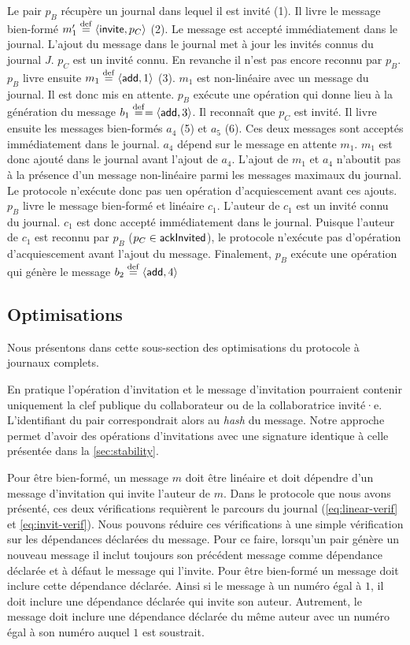 Le pair $p_B$ récupère un journal dans lequel il est invité (1).
Il livre le message bien-formé $m_1' \defeq \tuple*{\trm{invite}, p_C}$ (2).
Le message est accepté immédiatement dans le journal.
L'ajout du message dans le journal met à jour les invités connus du journal $J$.
$p_C$ est un invité connu.
En revanche il n'est pas encore reconnu par $p_B$.
$p_B$ livre ensuite $m_1 \defeq \tuple*{\trm{add}, 1}$ (3).
$m_1$ est non-linéaire avec un message du journal.
Il est donc mis en attente.
$p_B$ exécute une opération qui donne lieu à la génération du message $b_1 \defeq = \tuple*{\trm{add}, 3}$.
Il reconnaît que $p_C$ est invité.
Il livre ensuite les messages bien-formés $a_4$ (5) et $a_5$ (6).
Ces deux messages sont acceptés immédiatement dans le journal.
$a_4$ dépend sur le message en attente $m_1$.
$m_1$ est donc ajouté dans le journal avant l'ajout de $a_4$.
L'ajout de $m_1$ et $a_4$ n'aboutit pas à la présence d'un message non-linéaire parmi les messages maximaux du journal.
Le protocole n'exécute donc pas uen opération d'acquiescement avant ces ajouts.
$p_B$ livre le message bien-formé et linéaire $c_1$.
L'auteur de $c_1$ est un invité connu du journal.
$c_1$ est donc accepté immédiatement dans le journal.
Puisque l'auteur de $c_1$ est reconnu par $p_B$ ($p_C \in \trm{ackInvited}$), le protocole n'exécute pas d'opération d'acquiescement avant l'ajout du message.
Finalement, $p_B$ exécute une opération qui génère le message $b_2 \defeq \tuple*{\trm{add},4}$


\subsection{Optimisations}\label{subsec:full-log-opti}

Nous présentons dans cette sous-section des optimisations du protocole à journaux complets.

En pratique l'opération d'invitation et le message d'invitation pourraient contenir uniquement la clef publique du collaborateur ou de la collaboratrice invité·e.
L'identifiant du pair correspondrait alors au \emph{hash} du message.
Notre approche permet d'avoir des opérations d'invitations avec une signature identique à celle présentée dans la \autoref{sec:stability}.

Pour être bien-formé, un message $m$ doit être linéaire et doit dépendre d'un message d'invitation qui invite l'auteur de $m$.
Dans le protocole que nous avons présenté, ces deux vérifications requièrent le parcours du journal (\autoref{eq:linear-verif} et \autoref{eq:invit-verif}).
Nous pouvons réduire ces vérifications à une simple vérification sur les dépendances déclarées du message.
Pour ce faire, lorsqu'un pair génère un nouveau message il inclut toujours son précédent message comme dépendance déclarée et à défaut le message qui l'invite.
Pour être bien-formé un message doit inclure cette dépendance déclarée.
Ainsi si le message à un numéro égal à $1$, il doit inclure une dépendance déclarée qui invite son auteur.
Autrement, le message doit inclure une dépendance déclarée du même auteur avec un numéro égal à son numéro auquel $1$ est soustrait.

